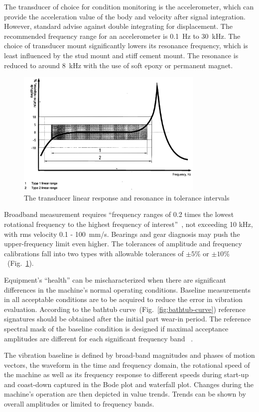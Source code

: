 The transducer of choice for condition monitoring is the accelerometer, which can provide the acceleration value of the body and velocity after signal integration. However, standard advise against double integrating for displacement. The recommended frequency range for an accelerometer is 0.1~Hz to 30~kHz. The choice of transducer mount significantly lowers its resonance frequency, which is least influenced by the stud mount and stiff cement mount. The resonance is reduced to around 8~kHz with the use of soft epoxy or permanent magnet.

\begin{figure}[h]
	\centering
	\includegraphics[width=0.8\textwidth]{assets/analysis/transducer-response.png}
	\caption{The transducer linear response and resonance in tolerance intervals~\cite{noauthor_iso_2002}}
	\label{fig:tranducer-response}
\end{figure}

Broadband measurement requires ``frequency ranges of 0.2 times the lowest rotational frequency to the highest frequency of interest''~\cite{noauthor_iso_2002}, not exceeding 10 kHz, with rms velocity 0.1 - 100~mm/s. Bearings and gear diagnosis may push the upper-frequency limit even higher. The tolerances of amplitude and frequency calibrations fall into two types with allowable tolerances of $\pm 5 \%$ or $\pm 10 \%$~(Fig.~\ref{fig:tranducer-response}).

Equipment's ``health'' can be mischaracterized when there are significant differences in the machine's normal operating conditions. Baseline measurements in all acceptable conditions are to be acquired to reduce the error in vibration evaluation. According to the bathtub curve~(Fig.~\ref{fig:bathtub-curve}) reference signatures should be obtained after the initial part wear-in period. The reference spectral mask of the baseline condition is designed if maximal acceptance amplitudes are different for each significant frequency band ~\cite{ziaran_technicka_2013}.

The vibration baseline is defined by broad-band magnitudes and phases of motion vectors, the waveform in the time and frequency domain, the rotational speed of the machine as well as its frequency response to different speeds during start-up and coast-down captured in the Bode plot and waterfall plot. Changes during the machine's operation are then depicted in value trends. Trends can be shown by overall amplitudes or limited to frequency bands.